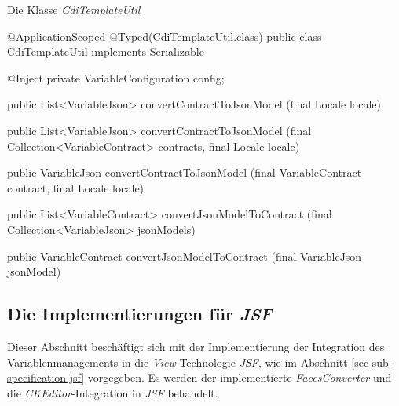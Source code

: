 \begin{program}[h]
\caption{Die Klasse \emph{CdiTemplateUtil}}
\label{prog:cdiTemplateUtil}
\begin{JavaCode}
@ApplicationScoped
@Typed(CdiTemplateUtil.class)
public class CdiTemplateUtil implements Serializable {

    @Inject
    private VariableConfiguration config;

    public List<VariableJson> convertContractToJsonModel
    						  (final Locale locale) { }

    public List<VariableJson> convertContractToJsonModel
    		(final Collection<VariableContract> contracts,
             final Locale locale) { }

    public VariableJson convertContractToJsonModel
           (final VariableContract contract,
            final Locale locale) { }
	
    public List<VariableContract> convertJsonModelToContract
    							 (final Collection<VariableJson> jsonModels) { }

    public VariableContract convertJsonModelToContract
                            (final VariableJson jsonModel) { }
}
\end{JavaCode}
\end{program}

\subsection{Die Implementierungen für \emph{JSF}}
\label{sec:sub-impl-integartion-jsf}
Dieser Abschnitt beschäftigt sich mit der Implementierung der Integration des Variablenmanagements in die \emph{View}-Technologie \emph{JSF}, wie im Abschnitt \ref{sec-sub-specification-jsf} vorgegeben. Es werden der implementierte \emph{FacesConverter} und die \emph{CKEditor}-Integration in \emph{JSF} behandelt.

